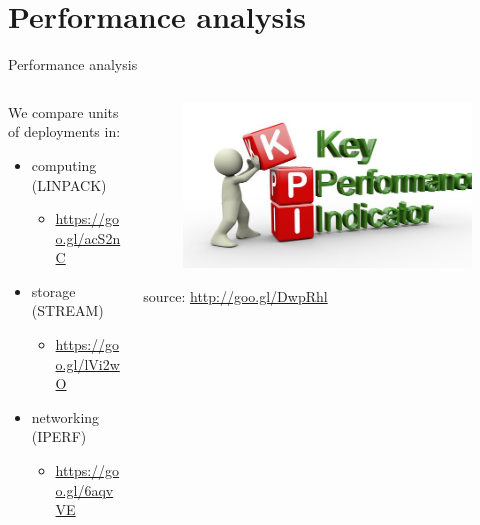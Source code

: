 %
%
\section{Performance analysis}
\begin{frame}{Performance analysis}
	\begin{columns}
		\begin{column}{0.6\textwidth}
			We compare units of deployments in:
			\begin{itemize}
				\item{\footnotesize{computing (LINPACK)}}
				\begin{itemize}
					\item{\tiny{\url{https://goo.gl/acS2nC}}}
				\end{itemize}
				\item{\footnotesize{storage (STREAM)}}
				\begin{itemize}
					\item{\tiny{\url{https://goo.gl/lVi2wO}}}
				\end{itemize}
				\item{\footnotesize{networking (IPERF)}}
				\begin{itemize}
					\item{\tiny{\url{https://goo.gl/6aqvVE}}}
				\end{itemize}
			\end{itemize}
		\end{column}
		\begin{column}{0.4\textwidth}
			\begin{figure}
				\centering{}
				\includegraphics[scale=0.2]{images/kpi.png}
			\end{figure}
			\begin{flushright}
				\tiny{source: \url{http://goo.gl/DwpRhl}}
			\end{flushright}
		\end{column}
	\end{columns}
\end{frame}

